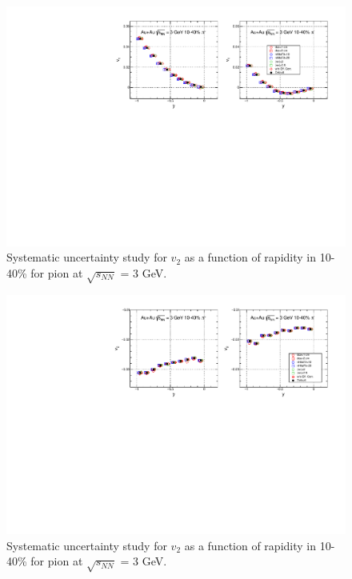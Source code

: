 \begin{figure}[h]
\includegraphics[scale=0.8]{FXT3gev/chapter3/fig/sys/pion/v1y_pion_sys.pdf}
\caption{Systematic uncertainty study for $v_{2}$ as a function of rapidity in 10-40\% for pion at $\sqrt{s_{NN}}$ = 3 GeV.}
\label{fig:pion_v1y_sys}
\end{figure}



\begin{figure}[h]
\includegraphics[scale=0.8]{FXT3gev/chapter3/fig/sys/pion/v2y_pion_sys.pdf}
\caption{Systematic uncertainty study for $v_{2}$ as a function of rapidity in 10-40\% for pion at $\sqrt{s_{NN}}$ = 3 GeV.}
\label{fig:pion_v2y_sys}
\end{figure}

